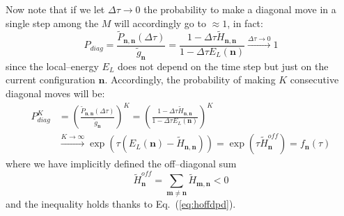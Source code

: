Now note that if we let $\Delta\tau \to 0$ the probability to make a diagonal move in a single step among the $M$ will accordingly go to $\approx 1$, in fact:
\begin{equation}
P_{diag} = \frac{\widetilde{P}_{\mathbf{n},\mathbf{n}}(\Delta\tau)}{\widetilde{g}_{\mathbf{n}}}
= \frac{1-\Delta\tau \widetilde{H}_{\mathbf{n},\mathbf{n}}}{1-\Delta\tau E_L(\mathbf{n})}
\xrightarrow{\Delta\tau \to 0} 1
\end{equation}
since the local--energy $E_L$ does not depend on the time step but just on the current configuration $\mathbf{n}$. Accordingly, the probability of making $K$ consecutive diagonal moves will be:
\begin{equation}
\begin{split}
P_{diag}^K &=\left( \frac{\widetilde{P}_{\mathbf{n},\mathbf{n}}(\Delta\tau)}{\widetilde{g}_{\mathbf{n}}} \right)^K = \left( \frac{1-\Delta\tau \widetilde{H}_{\mathbf{n},\mathbf{n}}}{1-\Delta\tau E_L(\mathbf{n})} \right)^K\\
&\xrightarrow{K \to \infty} \exp{\left(\tau (E_L(\mathbf{n}) - \widetilde{H}_{\mathbf{n},\mathbf{n}})\right)} = \exp{\left(\tau \widetilde{H}^{off}_{\mathbf{n}}\right)} = f_{\mathbf{n}}(\tau)
\end{split}
\end{equation}
where we have implicitly defined the off--diagonal sum 
\begin{equation}
\label{eq:hoffd}
\widetilde{H}^{off}_{\mathbf{n}} = \sum_{\mathbf{m}\neq \mathbf{n}} \widetilde{H}_{\mathbf{m},\mathbf{n}} <0
\end{equation}
and the inequality holds thanks to Eq.~(\eqref{eq:hoffdpd}).

